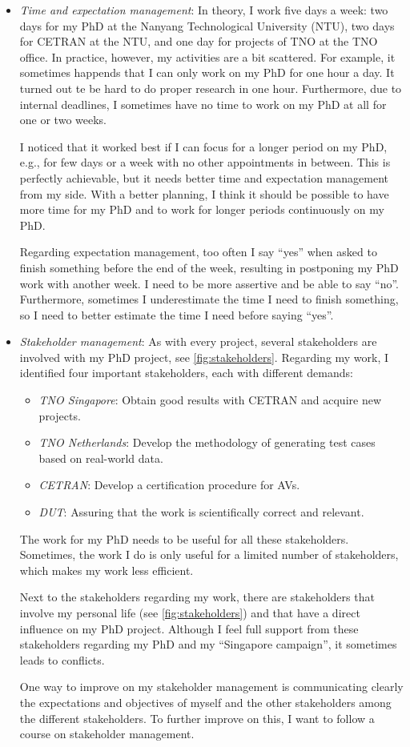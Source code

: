 \begin{itemize}
	\item \emph{Time and expectation management}: In theory, I work five days a week: two days for my PhD at the Nanyang Technological University (NTU), two days for CETRAN at the NTU, and one day for projects of TNO at the TNO office. In practice, however, my activities are a bit scattered. For example, it sometimes happends that I can only work on my PhD for one hour a day. It turned out te be hard to do proper research in one hour. Furthermore, due to internal deadlines, I sometimes have no time to work on my PhD at all for one or two weeks.
	
	I noticed that it worked best if I can focus for a longer period on my PhD, e.g., for few days or a week with no other appointments in between. This is perfectly achievable, but it needs better time and expectation management from my side. With a better planning, I think it should be possible to have more time for my PhD and to work for longer periods continuously on my PhD.
	
	Regarding expectation management, too often I say ``yes'' when asked to finish something before the end of the week, resulting in postponing my PhD work with another week. I need to be more assertive and be able to say ``no''. Furthermore, sometimes I underestimate the time I need to finish something, so I need to better estimate the time I need before saying ``yes''.
	
	\item \emph{Stakeholder management}: As with every project, several stakeholders are involved with my PhD project, see \cref{fig:stakeholders}. Regarding my work, I identified four important stakeholders, each with different demands:
	\begin{itemize}
		\item \emph{TNO Singapore}: Obtain good results with CETRAN and acquire new projects.
		\item \emph{TNO Netherlands}: Develop the methodology of generating test cases based on real-world data.
		\item \emph{CETRAN}: Develop a certification procedure for AVs.
		\item \emph{DUT}: Assuring that the work is scientifically correct and relevant.
	\end{itemize}
	The work for my PhD needs to be useful for all these stakeholders. Sometimes, the work I do is only useful for a limited number of stakeholders, which makes my work less efficient.
	
	Next to the stakeholders regarding my work, there are stakeholders that involve my personal life (see \cref{fig:stakeholders}) and that have a direct influence on my PhD project. Although I feel full support from these stakeholders regarding my PhD and my ``Singapore campaign'', it sometimes leads to conflicts.
	
	One way to improve on my stakeholder management is communicating clearly the expectations and objectives of myself and the other stakeholders among the different stakeholders. To further improve on this, I want to follow a course on stakeholder management.
\end{itemize}

